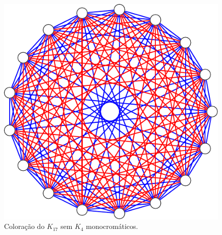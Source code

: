 \begin{figure}[ht!]
\centering
\includegraphics{figures/2_prelim_2_r44lb}
\caption{Coloração do $K_{17}$ sem $K_4$ monocromáticos.}
\label{prelim:fig:exr44}
\end{figure}

